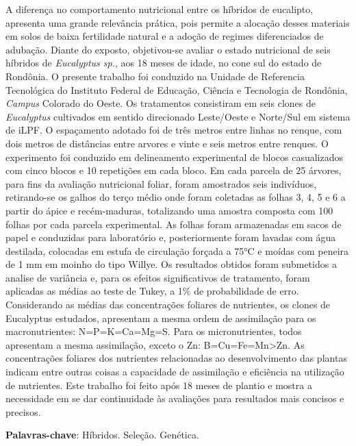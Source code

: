 \documentclass[article,12pt,onesidea,4paper,english,brazil]{abntex2}
\begin{document}
	\noindent A diferença no comportamento nutricional entre os híbridos de eucalipto, apresenta uma grande relevância prática, pois permite a alocação desses materiais em solos de baixa fertilidade natural e a adoção de regimes diferenciados de adubação.
	Diante do exposto, objetivou-se avaliar o estado nutricional de seis híbridos de
	\textit{Eucalyptus sp.}, aos 18 meses de idade, no cone sul do estado de Rondônia. O presente trabalho foi conduzido na Unidade de Referencia Tecnológica do Instituto
	Federal de Educação, Ciência e Tecnologia de Rondônia, \textit{Campus} Colorado do
	Oeste. Os tratamentos consistiram em seis clones de \textit{Eucalyptus} cultivados em sentido direcionado Leste/Oeste e Norte/Sul em sistema de iLPF. O espaçamento
	adotado foi de três metros entre linhas no renque, com dois metros de distâncias
	entre arvores e vinte e seis metros entre renques. O experimento foi conduzido em
	delineamento experimental de blocos casualizados com cinco blocos e 10 repetições
	em cada bloco. Em cada parcela de 25 árvores, para fins da avaliação nutricional
	foliar, foram amostrados seis indivíduos, retirando-se os galhos do terço médio onde foram coletadas as folhas 3, 4, 5 e 6 a partir do ápice e recém-maduras, totalizando uma amostra composta com 100 folhas por cada parcela experimental. As folhas foram armazenadas em sacos de papel e conduzidas para laboratório e,
	posteriormente foram lavadas com água destilada, colocadas em estufa de
	circulação forçada a 75°C e moídas com peneira de 1 mm em moinho do tipo
	Willye. Os resultados obtidos foram submetidos a analise de variância e, para os
	efeitos significativos de tratamento, foram aplicadas as médias ao teste de Tukey, a
	1\% de probabilidade de erro. Considerando as médias das concentrações foliares de
	nutrientes, os clones de Eucalyptus estudados, apresentam a mesma ordem de
	assimilação para os macronutrientes: N=P=K=Ca=Mg=S. Para os micronutrientes,
	todos apresentam a mesma assimilação, exceto o Zn: B=Cu=Fe=Mn>Zn. As
	concentrações foliares dos nutrientes relacionadas ao desenvolvimento das plantas
	indicam entre outras coisas a capacidade de assimilação e eficiência na utilização
	de nutrientes. Este trabalho foi feito após 18 meses de plantio e mostra a
	necessidade em se dar continuidade às avaliações para resultados mais concisos e
	precisos.
	
	\vspace{\onelineskip}
	
	\noindent
	\textbf{Palavras-chave}: Híbridos. Seleção. Genética.
	
\end{document}
